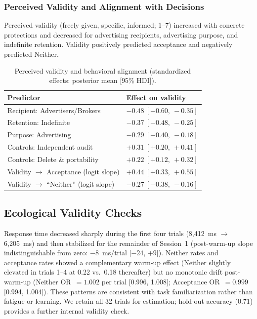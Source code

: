 \documentclass{eusset}
\begin{document}
\subsubsection{Perceived Validity and Alignment with Decisions}
Perceived validity (freely given, specific, informed; 1--7) increased with concrete protections and decreased for advertising recipients, advertising purpose, and indefinite retention. Validity positively predicted acceptance and negatively predicted Neither.

\begin{table}[h]
  \centering
  \begin{tabular}{l l}
    \textbf{Predictor} & \textbf{Effect on validity} \\
    \hline
    Recipient: Advertisers/Brokers & $-0.48\ [-0.60,\ -0.35]$ \\
    Retention: Indefinite & $-0.37\ [-0.48,\ -0.25]$ \\
    Purpose: Advertising & $-0.29\ [-0.40,\ -0.18]$ \\
    Controls: Independent audit & $+0.31\ [+0.20,\ +0.41]$ \\
    Controls: Delete \& portability & $+0.22\ [+0.12,\ +0.32]$ \\
    \addlinespace
    Validity $\rightarrow$ Acceptance (logit slope) & $+0.44\ [+0.33,\ +0.55]$ \\
    Validity $\rightarrow$ ``Neither'' (logit slope) & $-0.27\ [-0.38,\ -0.16]$ \\
  \end{tabular}
  \caption{Perceived validity and behavioral alignment (standardized effects: posterior mean [95\% HDI]).}
  \label{tab:validity}
\end{table}

\subsection{Ecological Validity Checks}
\label{subsec:ecological}
Response time decreased sharply during the first four trials (8{,}412~ms $\to$ 6{,}205~ms) and then stabilized for the remainder of Session~1 (post-warm-up slope indistinguishable from zero: $-8$~ms/trial [$-24$, $+9$]). Neither rates and acceptance rates showed a complementary warm-up effect (Neither slightly elevated in trials 1--4 at 0.22 vs.\ 0.18 thereafter) but no monotonic drift post-warm-up (Neither OR~$= 1.002$ per trial [0.996, 1.008]; Acceptance OR~$= 0.999$ [0.994, 1.004]). These patterns are consistent with task familiarization rather than fatigue or learning. We retain all 32 trials for estimation; hold-out accuracy (0.71) provides a further internal validity check.
\end{document}
